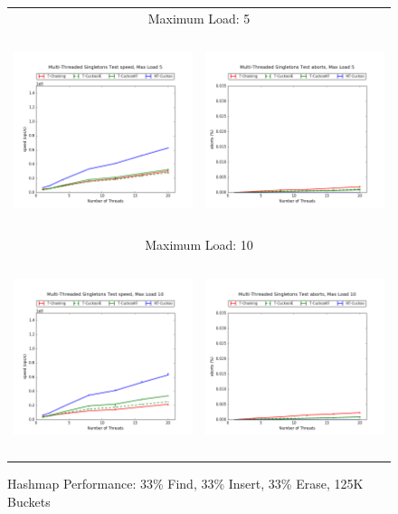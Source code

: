 \begin{figure}[h!]
    \centering
    \caption{Hashmap Performance: 33\% Find, 33\% Insert, 33\% Erase, 125K Buckets}
    \begin{tabular}{|cc|}
        \hline 
        \multicolumn{2}{|c|}{{\footnotesize Maximum Load: 5}}\\
        \includegraphics[height=2.25in]{maps/5HM125K:F34,I33,E33speed.png} &
        \includegraphics[height=2.25in]{maps/5HM125K:F34,I33,E33aborts.png}\\
        \hline 
        \multicolumn{2}{|c|}{{\footnotesize Maximum Load: 10}}\\
        \includegraphics[height=2.25in]{maps/10HM125K:F34,I33,E33speed.png} &
        \includegraphics[height=2.25in]{maps/10HM125K:F34,I33,E33aborts.png}\\

\end{tabular}
\end{figure}
